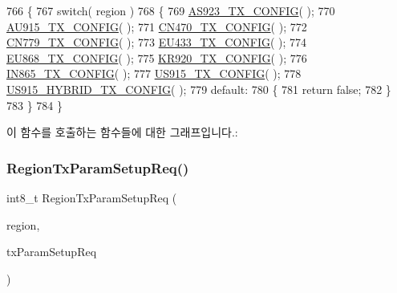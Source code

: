 \begin{DoxyCode}
766 \{
767     \textcolor{keywordflow}{switch}( region )
768     \{
769         \mbox{\hyperlink{_region_8c_ad794f8b2fd4d7d5e0e6bec408d85c3b3}{AS923\_TX\_CONFIG}}( );
770         \mbox{\hyperlink{_region_8c_a994f1815f2fd0b0cf94ae7e8a39333d0}{AU915\_TX\_CONFIG}}( );
771         \mbox{\hyperlink{_region_8c_a439995c1d3f77fb52bc5a3e23b90394c}{CN470\_TX\_CONFIG}}( );
772         \mbox{\hyperlink{_region_8c_a8f87695cd4312ff253702760fce2fb03}{CN779\_TX\_CONFIG}}( );
773         \mbox{\hyperlink{_region_8c_a434369c5916b8f408310dfb799b7aada}{EU433\_TX\_CONFIG}}( );
774         \mbox{\hyperlink{_region_8c_a1249040bdab4db30a7a92536e24f4399}{EU868\_TX\_CONFIG}}( );
775         \mbox{\hyperlink{_region_8c_aaedd30f354a3e16810e4b0c948006475}{KR920\_TX\_CONFIG}}( );
776         \mbox{\hyperlink{_region_8c_abbcd7f43652158d8a39fdca4800cff8c}{IN865\_TX\_CONFIG}}( );
777         \mbox{\hyperlink{_region_8c_ae61e8e9d988b7068b39d4feaa57eda96}{US915\_TX\_CONFIG}}( );
778         \mbox{\hyperlink{_region_8c_a34f197635fc67ae14d0c58d220d75419}{US915\_HYBRID\_TX\_CONFIG}}( );
779         \textcolor{keywordflow}{default}:
780         \{
781             \textcolor{keywordflow}{return} \textcolor{keyword}{false};
782         \}
783     \}
784 \}
\end{DoxyCode}
이 함수를 호출하는 함수들에 대한 그래프입니다.\+:
\mbox{\label{group___r_e_g_i_o_n_ga50dbaca7bf982330c183614302d525c4}} 
\subsubsection{\texorpdfstring{Region\+Tx\+Param\+Setup\+Req()}{RegionTxParamSetupReq()}}
{\footnotesize\ttfamily int8\+\_\+t Region\+Tx\+Param\+Setup\+Req (\begin{DoxyParamCaption}\item[{\mbox{\hyperlink{group___l_o_r_a_m_a_c_ga80c48efda9ae02e14b58160d34a798dd}{Lo\+Ra\+Mac\+Region\+\_\+t}}}]{region,  }\item[{\mbox{\hyperlink{group___r_e_g_i_o_n_ga26836ef2996e70410e42ef471073f855}{Tx\+Param\+Setup\+Req\+Params\+\_\+t}} $\ast$}]{tx\+Param\+Setup\+Req }\end{DoxyParamCaption})}



